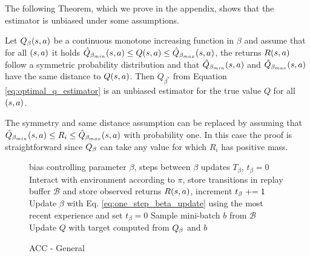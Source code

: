 The following Theorem, which we prove in the appendix, shows that the estimator is unbiased under some assumptions.
\begin{theorem}
Let $Q_\beta (s, a)$ be a continuous monotone increasing function in $\beta$ and
 assume that for all $(s, a)$ it holds $\hat{Q}_{\beta_{min}}(s,a) \leq Q(s, a) \leq  \hat{Q}_{\beta_{max}}(s,a)$, the returns $R(s, a)$ follow a symmetric probability distribution and that $\hat{Q}_{\beta_{min}}(s,a)$ and $\hat{Q}_{\beta_{max}}(s,a)$ have the same distance to $Q(s, a)$.
Then $Q_{\beta^*}$ from Equation \ref{eq:optimal_q_estimator} is an unbiased estimator for the true value $Q$ for all $(s, a)$.
\end{theorem}
The symmetry and same distance assumption can  be replaced by assuming that $\hat{Q}_{\beta_{min}}(s,a)  \leq R_i \leq \hat{Q}_{\beta_{max}}(s,a) $ with probability one. In this case the proof is straightforward since $Q_{\beta}$ can take any value for which $R_i$ has positive mass. 

\begin{figure}
\begin{algorithm}[H]
   \caption{ACC - General}
   \label{alg:general_acc}
\begin{algorithmic}
    bias controlling parameter $\beta$, steps between $\beta$ updates $T_\beta$, $t_\beta = 0$
   \STATE Interact with environment according to $\pi$, store transitions in replay buffer $\mathcal{B}$ and store observed returns $R(s, a)$, increment $t_\beta \mathrel{+}= 1$
   \STATE Update $\beta$ with Eq. \ref{eq:one_step_beta_update} using the most recent experience and set $t_\beta=0$
   \ENDIF
   \STATE Sample mini-batch $b$ from $\mathcal{B}$
   \STATE Update $Q$ with target computed from $Q_{\beta}$ and $b$
  \ENDFOR
\end{algorithmic}
\end{algorithm}
\vspace{-0.8cm}
\end{figure}

